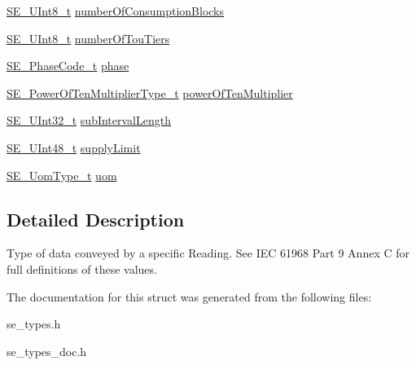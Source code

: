 \begin{DoxyCompactItemize}
\hyperlink{group__UInt8_gaf7c365a1acfe204e3a67c16ed44572f5}{S\+E\+\_\+\+U\+Int8\+\_\+t} \hyperlink{group__ReadingType_gaf04b33d882d8c1fc9a5234d3a2a7f01b}{number\+Of\+Consumption\+Blocks}
\item 
\hyperlink{group__UInt8_gaf7c365a1acfe204e3a67c16ed44572f5}{S\+E\+\_\+\+U\+Int8\+\_\+t} \hyperlink{group__ReadingType_ga815c888ead50b860c86080e455b1bb2b}{number\+Of\+Tou\+Tiers}
\item 
\hyperlink{group__PhaseCode_ga3eb7ce6c8beb3531baf0ba7723a2782c}{S\+E\+\_\+\+Phase\+Code\+\_\+t} \hyperlink{group__ReadingType_ga3857d20c24886f3715200ce0f9dd6f06}{phase}
\item 
\hyperlink{group__PowerOfTenMultiplierType_gaf0317b781dc8dbb9cb6ac4e44a14fdef}{S\+E\+\_\+\+Power\+Of\+Ten\+Multiplier\+Type\+\_\+t} \hyperlink{group__ReadingType_ga11cd4f657954c77645c4a09c3a7964a3}{power\+Of\+Ten\+Multiplier}
\item 
\hyperlink{group__UInt32_ga70bd4ecda3c0c85d20779d685a270cdb}{S\+E\+\_\+\+U\+Int32\+\_\+t} \hyperlink{group__ReadingType_gaba391fb84126105e4f4d8f6428906b99}{sub\+Interval\+Length}
\item 
\hyperlink{group__UInt48_gaa15d726fc29126d24b991437334d77a0}{S\+E\+\_\+\+U\+Int48\+\_\+t} \hyperlink{group__ReadingType_gae36049c7b71555f2c13bd42dc32453e7}{supply\+Limit}
\item 
\hyperlink{group__UomType_ga35de8fcdea40d7edbdd341581cf651f1}{S\+E\+\_\+\+Uom\+Type\+\_\+t} \hyperlink{group__ReadingType_ga1b34c217f3198c9de70789e4517720c4}{uom}
\end{DoxyCompactItemize}


\subsection{Detailed Description}
Type of data conveyed by a specific Reading. See I\+EC 61968 Part 9 Annex C for full definitions of these values. 

The documentation for this struct was generated from the following files\+:\begin{DoxyCompactItemize}
\item 
se\+\_\+types.\+h\item 
se\+\_\+types\+\_\+doc.\+h\end{DoxyCompactItemize}
